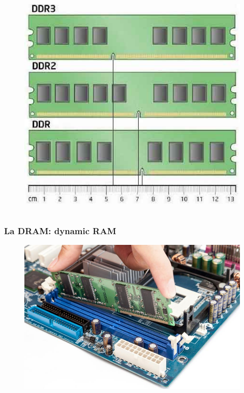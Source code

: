 \begin{frame}
\begin{columns}
		\begin{figure}[!htbp]
			\centering 
			\includegraphics[width=1.0\linewidth]{images/5_memory/ddr_compare.png}
		\end{figure}
	\end{columns}

\end{frame}


\begin{frame}
	\frametitle{La DRAM: dynamic RAM}
	 
	\begin{figure}[!htbp] 
		\centering
		\includegraphics[width=0.9\linewidth]{images/5_memory/ram_installation.jpg}
	\end{figure}
	
\end{frame}


